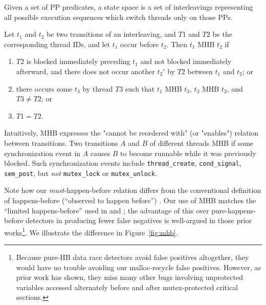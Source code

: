 \begin{definition}
Given a set of PP predicates, a state space is
a set of interleavings representing all possible execution sequences which switch threads only on those PPs.
\end{definition}

\begin{definition}[Must-happen-before (MHB)]
Let $t_1$ and $t_2$ be two transitions of an interleaving, and $T1$ and $T2$ be the corresponding thread IDs,
and let $t_1$ occur before $t_2$.
Then $t_1$ MHB $t_2$ if
\begin{enumerate}
	\item $T2$ is blocked immediately preceding $t_1$ and not blocked immediately afterward,
		and there does not occur another $t_2'$ by $T2$ between $t_1$ and $t_2$; or
	\item there occurs some $t_3$ by thread $T3$ such that $t_1$ MHB $t_3$, $t_3$ MHB $t_2$, and $T3 \ne T2$; or
	\item $T1 = T2$.
\end{enumerate}
\end{definition}

Intuitively, MHB expresses the "cannot be reordered with" (or "enables") relation between transitions.
Two transitions $A$ and $B$ of different threads MHB if some synchronization event in $A$ causes $B$ to become runnable while it was previously blocked. Such synchronization events include {\tt thread\_create}, {\tt cond\_signal}, {\tt sem\_post}, but {\em not} {\tt mutex\_lock} or {\tt mutex\_unlock}.

Note how our {\em must}-happen-before relation differs from the conventional definition of happens-before (``observed to happen before'') \cite{lamport-clocks}.
Our use of MHB matches the ``limited happens-before'' used in \cite{hybriddatarace} and \cite{tsan};
the advantage of this over pure-happens-before detectors in producing fewer false negatives is well-argued in those prior works\footnote{
Because pure-HB data race detectors avoid false positives altogether, they would have no trouble avoiding our malloc-recycle false positives.
However, as prior work has shown, they miss many other bugs involving unprotected variables accessed alternately before and after mutex-protected critical sections.
}.
We illustrate the difference in Figure~\ref{fig:mhb}.


